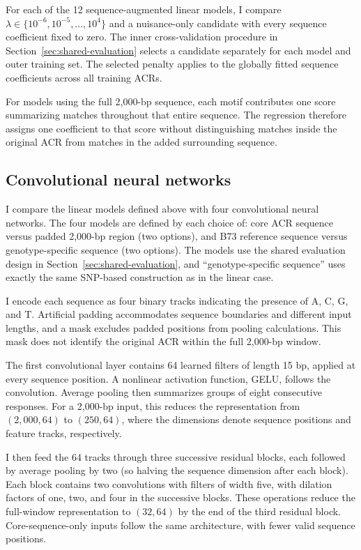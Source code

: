 \documentclass[10pt]{article}
\begin{document}
For each of the 12 sequence-augmented linear models, I compare
$\lambda\in\{10^{-6},10^{-5},\ldots,10^4\}$ and a nuisance-only
candidate with every sequence coefficient fixed to zero. The inner
cross-validation procedure in Section~\ref{sec:shared-evaluation}
selects a candidate separately for each model and outer training set.
The selected penalty applies to the globally fitted sequence
coefficients across all training ACRs.

For models using the full 2,000-bp sequence, each motif contributes
one score summarizing matches throughout that entire sequence.
The regression therefore assigns one coefficient to that score
without distinguishing matches inside the original ACR from
matches in the added surrounding sequence.

\subsection{Convolutional neural networks}\label{sec:cnn-models}
I compare the linear models defined above with four convolutional
neural networks. The four models are defined by each choice of:
core ACR sequence versus padded 2,000-bp region (two options), and
B73 reference sequence versus genotype-specific sequence (two
options). The models use the shared evaluation design in
Section~\ref{sec:shared-evaluation}, and ``genotype-specific sequence''
uses exactly the same SNP-based construction as in the linear case.

I encode each sequence as four binary tracks indicating the
presence of A, C, G, and T. Artificial padding accommodates sequence
boundaries and different input lengths, and a mask excludes padded
positions from pooling calculations. This mask does not identify
the original ACR within the full 2,000-bp window.

The first convolutional layer contains 64 learned filters of
length 15 bp, applied at every sequence position. A nonlinear
activation function, GELU, follows the convolution. Average pooling
then summarizes groups of eight consecutive responses. For a
2,000-bp input, this reduces the representation from
$(2,000,64)$ to $(250,64)$, where the dimensions denote sequence
positions and feature tracks, respectively.

I then feed the 64 tracks through three successive residual blocks,
each followed by average pooling by two (so halving the sequence dimension after each block). Each block contains two
convolutions with filters of width five, with dilation factors
of one, two, and four in the successive blocks. These operations
reduce the full-window representation to $(32,64)$ by the end of the third residual block. Core-sequence-only
inputs follow the same architecture, with fewer valid sequence
positions.
\end{document}

